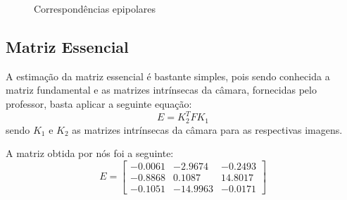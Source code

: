 \documentclass[journal]{IEEEtran}
\begin{document}
\begin{figure}[H]
        \centering
        \qquad
        \caption{Correspondências epipolares}
        \label{fig:9}
\end{figure}
    
\subsection*{Matriz Essencial}
\par A estimação da matriz essencial é bastante simples, pois sendo conhecida a matriz fundamental e as matrizes intrínsecas da câmara, fornecidas pelo professor, basta aplicar a seguinte equação:
\begin{equation}
    E = K_2^TFK_1
\end{equation}
sendo $K_1$ e $K_2$ as matrizes intrínsecas da câmara para as respectivas imagens.
\par A matriz obtida por nós foi a seguinte:
\begin{equation}
    E =
    \begin{bmatrix}
    -0.0061 & -2.9674 & -0.2493 \\
    -0.8868 & 0.1087 & 14.8017 \\
    -0.1051 & -14.9963 & -0.0171
    \end{bmatrix}
\end{equation}
\end{document}
